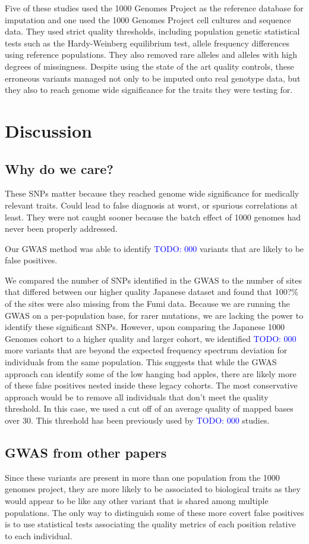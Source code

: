 \documentclass[12pt]{amsart}
\newcommand{\todo}[1]{\textcolor{blue}{TODO: #1}}
\begin{document}
{Five of these studies used the 1000 Genomes Project as the reference database for imputation and one used the 1000 Genomes Project cell cultures and sequence data. 
They used strict quality thresholds, including population genetic statistical tests such as the Hardy-Weinberg equilibrium test, allele frequency differences using reference populations. 
They also removed rare alleles and alleles with high degrees of missingness. 
Despite using the state of the art quality controls, these erroneous variants managed not only to be imputed onto real genotype data, but they also to reach genome wide significance for the traits they were testing for. 

			\section{Discussion}
\subsection{Why do we care?}
These SNPs matter because they reached genome wide significance for medically relevant traits. 
Could lead to false diagnosis at worst, or spurious correlations at least. 
They were not caught sooner because the batch effect of 1000 genomes had never been properly addressed. 

Our GWAS method was able to identify \todo{000} variants that are likely to be false positives.

We compared the number of SNPs identified in the GWAS to the number of sites that differed between our higher quality Japanese dataset and found that 100?\% of the sites were also missing from the Fumi data. 
Because we are running the GWAS on a per-population base, for rarer mutations, we are lacking the power to identify these significant SNPs.  
However, upon comparing the Japanese 1000 Genomes cohort to a higher quality and larger cohort, we identified \todo{000} more variants that are beyond the expected frequency spectrum deviation for individuals from the same population. 
This suggests that while the GWAS approach can identify some of the low hanging bad apples, there are likely more of these false positives nested inside these legacy cohorts. 
The most conservative approach would be to remove all individuals that don't meet the quality threshold. 
In this case, we used a cut off of an average quality of mapped bases over 30. This threshold has been previously used by \todo{000} studies.

\subsection{GWAS from other papers}
Since these variants are present in more than one population from the 1000 genomes project, they are more likely to be associated to biological traits as they would appear to be like any other variant that is shared among multiple populations. 
The only way to distinguish some of these more covert false positives is to use statistical tests associating the quality metrics of each position relative to each individual. 
}
\end{document}

